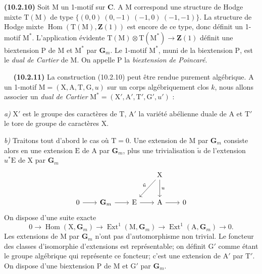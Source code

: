 \documentclass[11pt,leqno]{article}
\newcommand{\Page}[1]{\ifvmode\noindent\else\unskip\ \fi{\footnotesize\textcolor{gray}{[p.\,#1]}}\ \ignorespaces}
\begin{document}
\textbf{(10.2.10)} Soit \(\mathrm{M}\) un 1-motif sur
\(\mathbf{C}\). A \(\mathrm{M}\) correspond une structure de
Hodge mixte \(\mathrm{T}(\mathrm{M})\) de type
\(\{(0,0)\ (0,-1)\ (-1,0)\ (-1,-1)\}\).
La structure de Hodge mixte
\(\operatorname{Hom}(\mathrm{T}(\mathrm{M}),\mathbf{Z}(1))\)
est encore de ce type, donc définit un 1-motif \(\mathrm{M}^{*}\).
L’application évidente
\(\mathrm{T}(\mathrm{M})\otimes\mathrm{T}(\mathrm{M}^{*})
\to\mathbf{Z}(1)\) définit une biextension \(\mathrm{P}\) de
\(\mathrm{M}\) et \(\mathrm{M}^{*}\) par \(\mathbf{G}_m\).
Le 1-motif \(\mathrm{M}^{*}\), muni de la biextension
\(\mathrm{P}\), est le \textit{dual de Cartier} de \(\mathrm{M}\).
On appelle \(\mathrm{P}\) la \textit{biextension de Poincaré}.

\Page{67}
\textbf{(10.2.11)} La construction (10.2.10) peut être rendue
purement algébrique. A un 1-motif
\(\mathrm{M}=(\mathrm{X},\mathrm{A},\mathrm{T},\mathrm{G},u)\)
sur un corps algébriquement clos \(k\), nous allons associer
un \textit{dual de Cartier}
\(\mathrm{M}^{*}=(\mathrm{X}',\mathrm{A}',\mathrm{T}',
\mathrm{G}',u')\) :

\textit{a)} \(\mathrm{X}'\) est le groupe des caractères de
\(\mathrm{T}\), \(\mathrm{A}'\) la variété abélienne duale de
\(\mathrm{A}\) et \(\mathrm{T}'\) le tore de groupe de
caractères \(\mathrm{X}\).

\textit{b)} Traitons tout d’abord le cas où \(\mathrm{T}=0\).
Une extension de \(\mathrm{M}\) par \(\mathbf{G}_m\) consiste
alors en une extension \(\mathrm{E}\) de \(\mathrm{A}\) par
\(\mathbf{G}_m\), plus une trivialisation \(\tilde{u}\) de
l’extension \(u^{*}\mathrm{E}\) de \(\mathrm{X}\) par
\(\mathbf{G}_m\)
\[
\begin{tikzcd}[row sep=2.5em, column sep=2em]
&&& \mathrm{X} \arrow[dl, "\tilde{u}"'] \arrow[d, "u"] &\\
0 \arrow[r] & \mathbf{G}_m \arrow[r] &
\mathrm{E} \arrow[r] & \mathrm{A} \arrow[r] & 0
\end{tikzcd}
\]
On dispose d’une suite exacte
\[
0\to\operatorname{Hom}(\mathrm{X},\mathbf{G}_m)
\to\operatorname{Ext}^{1}(\mathrm{M},\mathbf{G}_m)
\to\operatorname{Ext}^{1}(\mathrm{A},\mathbf{G}_m)\to0.
\]
Les extensions de \(\mathrm{M}\) par \(\mathbf{G}_m\) n’ont
pas d’automorphisme non trivial. Le foncteur des classes
d’isomorphie d’extensions est représentable; on définit
\(\mathrm{G}'\) comme étant le groupe algébrique qui représente
ce foncteur; c’est une extension de \(\mathrm{A}'\) par
\(\mathrm{T}'\). On dispose d’une biextension \(\mathrm{P}\)
de \(\mathrm{M}\) et \(\mathrm{G}'\) par \(\mathbf{G}_m\).
\end{document}
